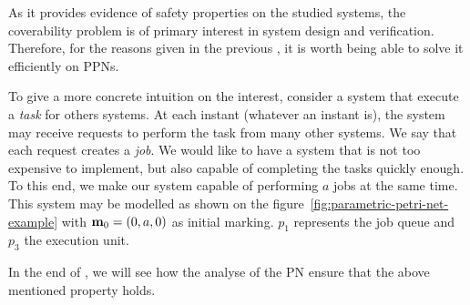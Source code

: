 
As it provides evidence of safety properties on the studied systems, the coverability problem is of primary interest in system design and verification. Therefore, for the reasons given in the previous , it is worth being able to solve it efficiently on \acp{PPN}.

\label{label:mutex-example}
To give a more concrete intuition on the interest, consider a system that execute a \emph{task} for others systems.
At each instant (whatever an instant is), the system may receive requests to perform the task from many other systems. We say that each request creates a \emph{job}.
We would like to have a system that is not too expensive to implement, but also capable of completing the tasks quickly enough.
To this end, we make our system capable of performing $a$ jobs at the same time. %
This system may be modelled as shown on the figure~\ref{fig:parametric-petri-net-example} with $\mari = (0, \param[1], 0)$ as initial marking.
$p_1$ represents the job queue and $p_3$ the execution unit.

In the end of , we will see how the analyse of the \ac{PN} ensure that the above mentioned property holds.
